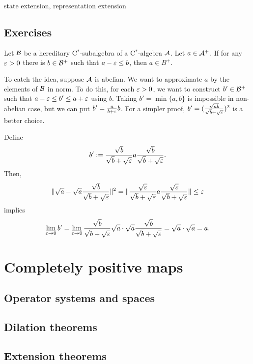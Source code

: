 \documentclass{../../large}
\begin{document}
\begin{prb}
\end{prb}



\begin{prb}
state extension, representation extension
\end{prb}




\section*{Exercises}
\begin{prb}
Let $\mathcal{B}$ be a hereditary C$^*$-subalgebra of a C$^*$-algebra $\mathcal{A}$.
Let $a\in\mathcal{A}^+$.
If for any $\varepsilon>0$ there is $b\in\mathcal{B}^+$ such that $a-\varepsilon\le b$, then $a\in B^+$.
\end{prb}
\begin{pf}
To catch the idea, suppose $\mathcal{A}$ is abelian.
We want to approximate $a$ by the elements of $\mathcal{B}$ in norm.
To do this, for each $\varepsilon>0$, we want to construct $b'\in\mathcal{B}^+$ such that $a-\varepsilon\le b'\le a+\varepsilon$ using $b$.
Taking $b'=\min\{a,b\}$ is impossible in non-abelian case, but we can put $b'=\frac a{b+\varepsilon}b$.
For a simpler proof, $b'=(\frac{\sqrt{ab}}{\sqrt b+\sqrt{\varepsilon}})^2$ is a better choice.

Define
\[b':=\frac{\sqrt b}{\sqrt b+\sqrt{\varepsilon}}a\frac{\sqrt b}{\sqrt b+\sqrt{\varepsilon}}.\]
Then,
\[\|\sqrt a-\sqrt a\frac{\sqrt b}{\sqrt b+\sqrt{\varepsilon}}\|^2=\|\frac{\sqrt{\varepsilon}}{\sqrt b+\sqrt{\varepsilon}}a\frac{\sqrt{\varepsilon}}{\sqrt b+\sqrt{\varepsilon}}\|\le\varepsilon\]
implies
\[\lim_{\varepsilon\to0}b'=\lim_{\varepsilon\to0}\frac{\sqrt b}{\sqrt b+\sqrt{\varepsilon}}\sqrt a\cdot\sqrt a\frac{\sqrt b}{\sqrt b+\sqrt{\varepsilon}}=\sqrt a\cdot\sqrt a=a.\]
\end{pf}


\chapter{Completely positive maps}

\section{Operator systems and spaces}

\section{Dilation theorems}

\section{Extension theorems}
\end{document}
